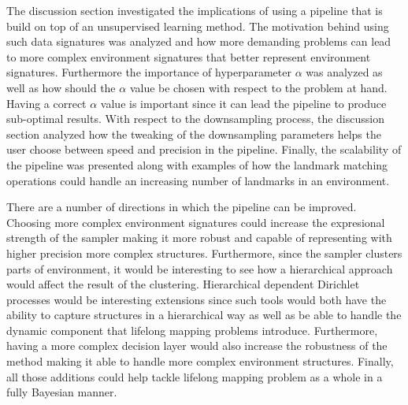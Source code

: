 \documentclass[twoside,hidelinks]{article}
\begin{document}
 The discussion section investigated the implications of using a pipeline that is build on top of an unsupervised learning method. 
 The motivation behind using such data signatures was analyzed and how more demanding problems can lead to more complex environment signatures that better represent environment signatures.
 Furthermore the importance of hyperparameter $\alpha$ was analyzed as well as how should the $\alpha$ value be chosen with respect to the problem at hand. Having a correct $\alpha$ value is important since it can lead the pipeline to produce sub-optimal results. 
 With respect to the downsampling process, the discussion section analyzed how the tweaking of the downsampling parameters helps the user choose between speed and precision in the pipeline. 
 Finally, the scalability of the pipeline was presented along with examples of how the landmark matching operations could handle an increasing number of landmarks in an environment.

There are a number of directions in which the pipeline can be improved.
Choosing more complex environment signatures could increase the expresional strength of the sampler making it more robust and capable of representing with higher precision more complex structures.
Furthermore, since the sampler clusters parts of environment, it would be interesting to see how a hierarchical approach would affect the result of the clustering.
Hierarchical dependent Dirichlet processes would be interesting extensions since such tools would both have the ability to capture structures in a hierarchical way as well as be able to handle the dynamic component that lifelong mapping problems introduce. 
Furthermore, having a more complex decision layer would also increase the robustness of the method making it able to handle more complex environment structures. 
Finally, all those additions could help tackle lifelong mapping problem as a whole in a fully Bayesian manner.


\end{document}
